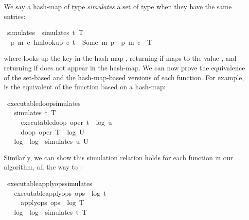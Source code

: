 \documentclass[sigplan,anonymous]{acmart}
\renewenvironment{isabelle}{%
  \medbreak\noindent%
  \renewcommand{\isanewline}{\\}%
  \begin{minipage}{\columnwidth}%
  \begin{isabellebody}%
  \begin{tabbing}%
}{%
  \end{tabbing}%
  \end{isabellebody}%
  \end{minipage}%
  \medbreak%
}
\renewcommand{\isacartoucheopen}{}
\renewcommand{\isacartoucheclose}{}
\begin{document}
We say a hash-map  of type  \emph{simulates} a set  of type  when they have the same entries:
\begin{isabelle}
\isamarkupfalse%
\ simulates\ \ {\isacartoucheopen}simulates\ t\ T\ {\isasymequiv}\isanewline
\ \ {\isacharparenleft}{\isasymforall}p\ m\ c{\isachardot}\ hm{\isachardot}lookup\ c\ t\ {\isacharequal}\ Some\ {\isacharparenleft}m{\isacharcomma}\ p{\isacharparenright}\ {\isasymlongleftrightarrow}\ {\isacharparenleft}p{\isacharcomma}\ m{\isacharcomma}\ c{\isacharparenright}\ {\isasymin}\ T{\isacharparenright}{\isacartoucheclose}
\end{isabelle}
\noindent where  looks up the key  in the hash-map , returning  if  maps to the value , and returning  if  does not appear in the hash-map.
We can now prove the equivalence of the set-based and the hash-map-based versions of each function.
For example,  is the equivalent of the  function based on a hash-map:
\begin{isabelle}
\isamarkupfalse%
\ executable{\isacharunderscore}do{\isacharunderscore}op{\isacharunderscore}simulates{\isacharcolon}\isanewline
\ \ \ {\isacartoucheopen}simulates\ t\ T{\isacartoucheclose}\isanewline
\ \ \ \ \ {\isacartoucheopen}executable{\isacharunderscore}do{\isacharunderscore}op\ {\isacharparenleft}oper{\isacharcomma}\ t{\isacharparenright}\ {\isacharequal}\ {\isacharparenleft}log{}{\isacharcomma}\ u{\isacharparenright}{\isacartoucheclose}\isanewline
\ \ \ \ \ {\isacartoucheopen}do{\isacharunderscore}op\ {\isacharparenleft}oper{\isacharcomma}\ T{\isacharparenright}\ {\isacharequal}\ {\isacharparenleft}log{}{\isacharcomma}\ U{\isacharparenright}{\isacartoucheclose}\isanewline
\ \ \ {\isacartoucheopen}log{}\ {\isacharequal}\ log{}\ {\isasymand}\ simulates\ u\ U{\isacartoucheclose}
\end{isabelle}

Similarly, we can show this simulation relation holds for each function in our algorithm, all the way to :
\begin{isabelle}
\isamarkupfalse%
\ executable{\isacharunderscore}apply{\isacharunderscore}ops{\isacharunderscore}simulates{\isacharcolon}\isanewline
\ \ \ {\isacartoucheopen}executable{\isacharunderscore}apply{\isacharunderscore}ops\ ops\ {\isacharequal}\ {\isacharparenleft}log{}{\isacharcomma}\ t{\isacharparenright}{\isacartoucheclose}\isanewline
\ \ \ \ \ {\isacartoucheopen}apply{\isacharunderscore}ops\ ops\ {\isacharequal}\ {\isacharparenleft}log{}{\isacharcomma}\ T{\isacharparenright}{\isacartoucheclose}\isanewline
\ \ \ {\isacartoucheopen}log{}\ {\isacharequal}\ log{}\ {\isasymand}\ simulates\ t\ T{\isacartoucheclose}
\end{isabelle}
\end{document}
